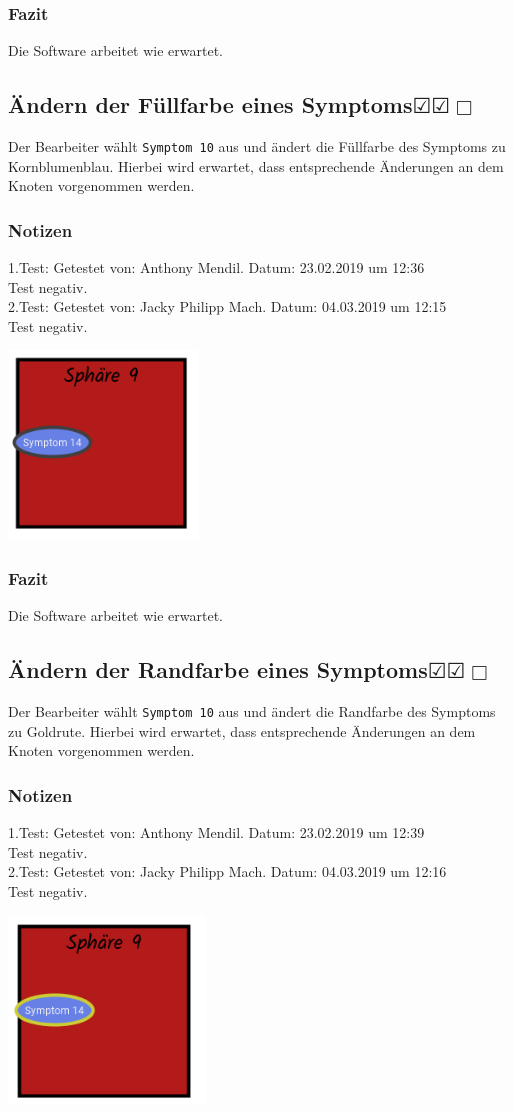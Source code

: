 \documentclass[enabledeprecatedfontcommands]{scrartcl}
\newcommand{\subsectiont}[2]{\subsection[#1]{#1{\normalsize\normalfont #2}}}
\newcommand{\leer}{$\Box$}
\newcommand{\ok}{$\CheckedBox$}
\begin{document}
\subsubsection{Fazit}
Die Software arbeitet wie erwartet.

\subsectiont{Ändern der Füllfarbe eines Symptoms}{\dotfill\ok\ok\leer}
Der Bearbeiter wählt \texttt{Symptom 10} aus und ändert die Füllfarbe des Symptoms zu Kornblumenblau. Hierbei wird erwartet, dass entsprechende Änderungen an dem Knoten vorgenommen werden.
\subsubsection{Notizen}
1.Test: Getestet von: Anthony Mendil. Datum: 23.02.2019 um 12:36 \\
Test negativ.\\
2.Test: Getestet von: Jacky Philipp Mach. Datum: 04.03.2019 um 12:15 \\
Test negativ.
\begin{center}
\includegraphics[height=5cm]{2_25.PNG}
\end{center}
\subsubsection{Fazit}
Die Software arbeitet wie erwartet.

\subsectiont{Ändern der Randfarbe eines Symptoms}{\dotfill\ok\ok\leer}
Der Bearbeiter wählt \texttt{Symptom 10} aus und ändert die Randfarbe des Symptoms zu Goldrute. Hierbei wird erwartet, dass entsprechende Änderungen an dem Knoten vorgenommen werden.
\subsubsection{Notizen}
1.Test: Getestet von: Anthony Mendil. Datum: 23.02.2019 um 12:39 \\
Test negativ.\\
2.Test: Getestet von: Jacky Philipp Mach. Datum: 04.03.2019 um 12:16 \\
Test negativ.
\begin{center}
\includegraphics[height=5cm]{2_26.PNG}
\end{center}
\end{document}

